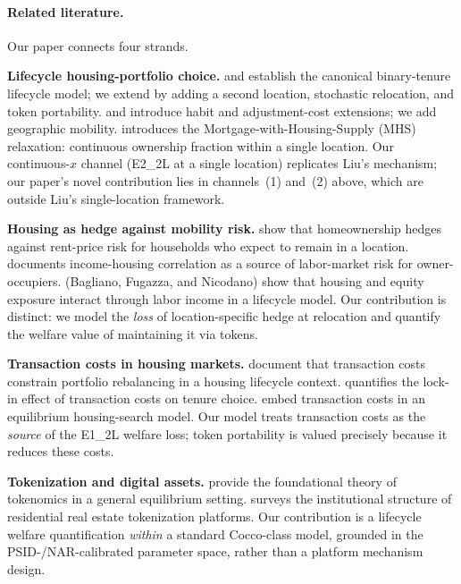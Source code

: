 \paragraph{Related literature.}
Our paper connects four strands.

\medskip\noindent
\textbf{Lifecycle housing-portfolio choice.}
\citet{YaoZhang2005} and \citet{Cocco2005} establish the canonical
binary-tenure lifecycle model; we extend by adding a second location,
stochastic relocation, and token portability.
\citet{KraftMunk2011} and \citet{KMW2018} introduce habit and
adjustment-cost extensions; we add geographic mobility.
\citet{Liu2021} introduces the Mortgage-with-Housing-Supply (MHS)
relaxation: continuous ownership fraction within a single location.
Our continuous-$x$ channel (E2\_2L at a single location) replicates Liu's
mechanism; our paper's novel contribution lies in channels~(1) and~(2)
above, which are outside Liu's single-location framework.

\medskip\noindent
\textbf{Housing as hedge against mobility risk.}
\citet{SinaiSouleles2005} show that homeownership hedges against rent-price
risk for households who expect to remain in a location.
\citet{Davidoff2006} documents income-housing correlation as a source of
labor-market risk for owner-occupiers.
\citet{BFN2014} (Bagliano, Fugazza, and Nicodano) show that housing and
equity exposure interact through labor income in a lifecycle model.
Our contribution is distinct: we model the \emph{loss} of location-specific
hedge at relocation and quantify the welfare value of maintaining it via tokens.

\medskip\noindent
\textbf{Transaction costs in housing markets.}
\citet{FlavinYamashita2002} document that transaction costs constrain
portfolio rebalancing in a housing lifecycle context.
\citet{Han2013} quantifies the lock-in effect of transaction costs on
tenure choice.
\citet{PiazzesiSchneider2016} embed transaction costs in an equilibrium
housing-search model.
Our model treats transaction costs as the \emph{source} of the E1\_2L
welfare loss; token portability is valued precisely because it reduces these costs.

\medskip\noindent
\textbf{Tokenization and digital assets.}
\citet{CongLiWang2021} provide the foundational theory of tokenomics in a
general equilibrium setting.
\citet{Swinkels2023} surveys the institutional structure of residential
real estate tokenization platforms.
Our contribution is a lifecycle welfare quantification \emph{within} a
standard Cocco-class model, grounded in the PSID-/NAR-calibrated parameter
space, rather than a platform mechanism design.

